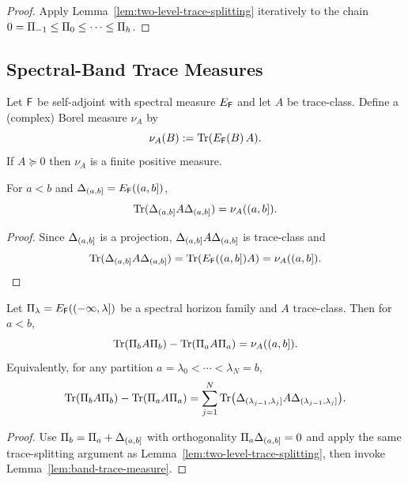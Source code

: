 \begin{proof}
Apply Lemma~\ref{lem:two-level-trace-splitting} iteratively to the chain $0=\Pi_{-1}\le \Pi_{0}\le \cdots \le \Pi_{h}$.
\end{proof}

\subsection{Spectral-Band Trace Measures}
\label{subsec:trace-level-spectral}

\begin{definition}
\label{def:spectral-trace-measure}
Let $\mathsf{F}$ be self-adjoint with spectral measure $E_{\mathsf{F}}$ and let $A$ be trace-class.
Define a (complex) Borel measure $\nu_A$ by
\[
\nu_A(B) := \mathrm{Tr}(E_{\mathsf{F}}(B)\,A).
\]
If $A\succeq 0$ then $\nu_A$ is a finite positive measure.
\end{definition}

\begin{lemma}
\label{lem:band-trace-measure}
For $a<b$ and $\Delta_{(a,b]}=E_{\mathsf{F}}((a,b])$,
\[
\mathrm{Tr}(\Delta_{(a,b]}A\Delta_{(a,b]}) = \nu_A((a,b]).
\]
\end{lemma}

\begin{proof}
Since $\Delta_{(a,b]}$ is a projection, $\Delta_{(a,b]}A\Delta_{(a,b]}$ is trace-class and
\[
\mathrm{Tr}(\Delta_{(a,b]}A\Delta_{(a,b]})
=\mathrm{Tr}(E_{\mathsf{F}}((a,b])A)
=\nu_A((a,b]).
\]
\end{proof}

\begin{theorem}
\label{thm:trace-telescoping-spectral}
Let $\Pi_{\lambda}=E_{\mathsf{F}}((-\infty,\lambda])$ be a spectral horizon family and $A$ trace-class.
Then for $a<b$,
\[
\mathrm{Tr}(\Pi_{b} A\Pi_{b})-\mathrm{Tr}(\Pi_{a} A\Pi_{a})=\nu_A((a,b]).
\]
Equivalently, for any partition $a=\lambda_0<\cdots<\lambda_N=b$,
\[
\mathrm{Tr}(\Pi_{b} A\Pi_{b})-\mathrm{Tr}(\Pi_{a} A\Pi_{a})=\sum_{j=1}^N \mathrm{Tr}\big(\Delta_{(\lambda_{j-1},\lambda_j]}A\Delta_{(\lambda_{j-1},\lambda_j]}\big).
\]
\end{theorem}

\begin{proof}
Use $\Pi_{b}=\Pi_{a}+\Delta_{(a,b]}$ with orthogonality $\Pi_{a}\Delta_{(a,b]}=0$ and apply the same trace-splitting argument as Lemma~\ref{lem:two-level-trace-splitting}, then invoke Lemma~\ref{lem:band-trace-measure}.
\end{proof}

